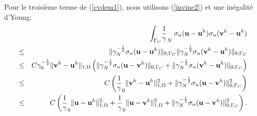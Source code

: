 \documentclass[11pt]{book}
\def\u{{\bf u}}
\def\vv{{\bf v}}
\newcommand{\ds}{\displaystyle}
\newcommand{\Gc}{\Gamma_{C}}
\newcommand{\dg}{d\Gamma}
\newcommand{\igc}{{\ds\int_{\Gc}\hspace*{-0.7em}}}
\newcommand{\sn}{{\sigma_n}}
\newcommand{\gz}{\gamma_{0}}
\newcommand{\gN}{\gamma_{N}}
\begin{document}
Pour le troisième terme de (\ref{cvdem1}), nous utilisons (\ref{invine2}) et une inégalité d'Young:
\begin{eqnarray}
&&  \igc \:\:\: \frac1\gN \: \sn(\u - \u^h) \sn(\vv^h- \u^h) %
\nonumber\\ &\le& \Vert
  \gN^{-\frac{1}{2}}
  \sn(\u-\u^h) \Vert_{0,\Gamma_C} \Vert
  \gN^{-\frac{1}{2}}
  \sn(\vv^h-\u^h) \Vert_{0,\Gamma_C} \nonumber\\
  &\le& C
   \gz^{-\frac{1}{2}}\Vert
  \vv^h-\u^h \Vert_{1,\Omega} \left(  \Vert
  \gN^{-\frac{1}{2}}
  \sn(\u-\vv^h) \Vert_{0,\Gamma_C} +  \Vert
  \gN^{-\frac{1}{2}}
  \sn(\vv^h-\u^h) \Vert_{0,\Gamma_C}\right) \nonumber\\
   &\le& C \left(\frac1\gz \Vert
  \vv^h-\u^h \Vert_{1,\Omega}^2 +  \Vert
  \gN^{-\frac{1}{2}}
  \sn(\u-\vv^h) \Vert_{0,\Gamma_C}^2 \right) \nonumber\\
    &\le& C \left(\frac1\gz \Vert
  \u-\u^h \Vert_{1,\Omega}^2 + \frac1\gz \Vert
  \u-\vv^h \Vert_{1,\Omega}^2 +  \Vert
  \gN^{-\frac{1}{2}}
  \sn(\u-\vv^h) \Vert_{0,\Gamma_C}^2 \right). \label{estimTL2b}
\end{eqnarray}
\end{document}
